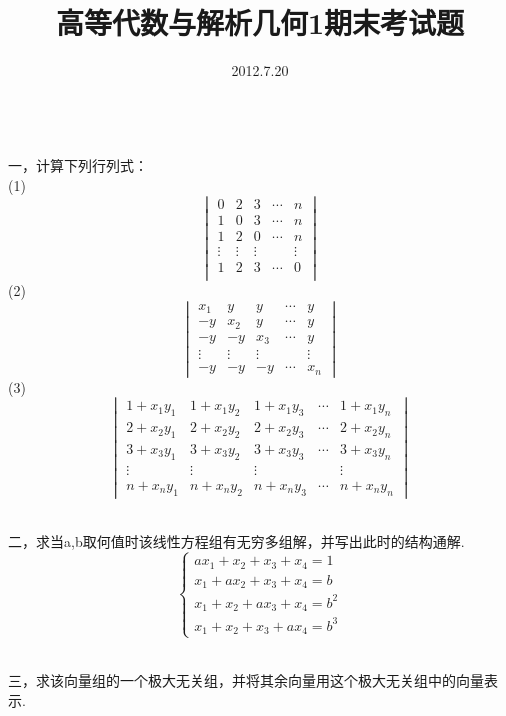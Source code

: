 \documentclass[12pt, a4paper, oneside]{ctexart}
\title{高等代数与解析几何1期末考试题}
\author{}
\date{2012.7.20}
\begin{document}
\maketitle
\;
\\一，计算下列行列式：
\\
(1)\\
$$\begin{vmatrix}0 & 2 & 3 & \cdots & n\\
			 1 & 0 & 3 & \cdots & n\\
			 1 & 2 & 0 & \cdots & n\\
			 \vdots & \vdots & \vdots & \; & \vdots \\
			 1 & 2 & 3 & \cdots & 0\\\end{vmatrix}$$
(2)\\
$$\begin{vmatrix}
x_1 & y & y & \cdots & y\\
-y & x_2 & y & \cdots & y\\
-y & -y & x_3 & \cdots & y\\
\vdots & \vdots & \vdots & \; & \vdots\\
-y & -y & -y & \cdots & x_n
\end{vmatrix}$$
(3)\\
$$\begin{vmatrix}
1+x_1y_1 & 1+x_1y_2 & 1+x_1y_3 & \cdots & 1+x_1y_n\\
2+x_2y_1 & 2+x_2y_2 & 2+x_2y_3 & \cdots & 2+x_2y_n\\
3+x_3y_1 & 3+x_3y_2 & 3+x_3y_3 & \cdots & 3+x_3y_n\\
\vdots & \vdots & \vdots & \; & \vdots\\
n+x_ny_1 & n+x_ny_2 & n+x_ny_3 & \cdots & n+x_ny_n
\end{vmatrix}$$

\;
\\二，求当a,b取何值时该线性方程组有无穷多组解，并写出此时的结构通解.
$$\begin{cases} 
ax_1+x_2+x_3+x_4=1\\
x_1+ax_2+x_3+x_4=b\\
x_1+x_2+ax_3+x_4=b^2\\
x_1+x_2+x_3+ax_4=b^3
\end{cases}$$

\;
\\三，求该向量组的一个极大无关组，并将其余向量用这个极大无关组中的向量表示.\\

\;
\end{document}

